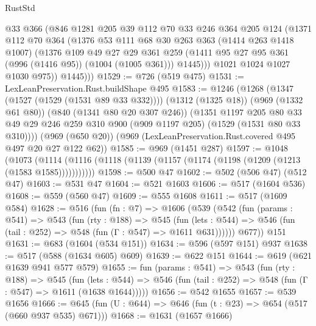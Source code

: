 \begin{lexlean}{RustStd}
\begin{coremodule}
            @33
            @366
            (@846
              @1281
              @205
              @39
              @112
              @70
              @33
              @246
              @364
              @205
              @124
              (@1371
                @112
                @70
                @364
                (@1376
                  @53
                  @111
                  @68
                  @30
                  @263
                  @363
                  (@1414 @263 @1418 @1007)
                  (@1376
                    @109
                    @49
                    @27
                    @29
                    @361
                    @259
                    (@1411 @95 @27 @95 @361 (@996 (@1416 @95)) (@1004 (@1005 @361)))
                    @1445)))
              @1021
              @1024
              @1027
              @1030
              @975))
          @1445)))
@1529 := @726 (@519 @475)
@1531 := LexLeanPreservation.Rust.buildShape @495
@1583 := @1246
    (@1268
      (@1347 (@1527 (@1529 (@1531 @89 @33 @332))))
      (@1312 (@1325 @18))
      (@969 (@1332 @61 @80))
      (@840 (@1341 @80 @20 @307 @246))
      (@1351
        @1197
        @205
        @80
        @33
        @49
        @29
        @246
        @259
        @310
        @900
        (@909 @1197 @205)
        (@1529 (@1531 @80 @33 @310))))
    (@969 (@650 @20))
    (@969 (LexLeanPreservation.Rust.covered @495 @497 @20 @27 @122 @62))
@1585 := @969 (@1451 @287)
@1597 := @1048
    (@1073 (@1114 (@1116 (@1118 (@1139 (@1157 (@1174 (@1198 (@1209 (@1213 (@1583 @1585)))))))))))
@1598 := @500 @47
@1602 := @502 (@506 @47) (@512 @47)
@1603 := @531 @47
@1604 := @521 @1603
@1606 := @517 (@1604 @536)
@1608 := @559 (@560 @47)
@1609 := @555 @1608
@1611 := @517 (@1609 @584)
@1628 := @516
    (fun (fn : @7) =>
    @1606
      (@539
        (@542
          (fun (params : @541) =>
          @543
            (fun (rty : @188) =>
            @545
              (fun (lets : @544) =>
              @546 (fun (tail : @252) => @548 (fun (Γ : @547) => @1611 @631))))))
        @677))
    @151
@1631 := @683 (@1604 (@534 @151))
@1634 := @596 (@597 @151) @937
@1638 := @517 (@588 (@1634 @605) @609)
@1639 := @622 @151
@1644 := @619 (@621 @1639 @941 @577 @579)
@1655 := fun (params : @541) =>
  @543
    (fun (rty : @188) =>
    @545
      (fun (lets : @544) =>
      @546 (fun (tail : @252) => @548 (fun (Γ : @547) => @1611 (@1638 @1644)))))
@1656 := @542 @1655
@1657 := @539 @1656
@1666 := @645 (fun (U : @644) => @646 (fun (t : @23) => @654 (@517 (@660 @937 @535) @671)))
@1668 := @1631 (@1657 @1666)

\end{coremodule}
\end{lexlean}
